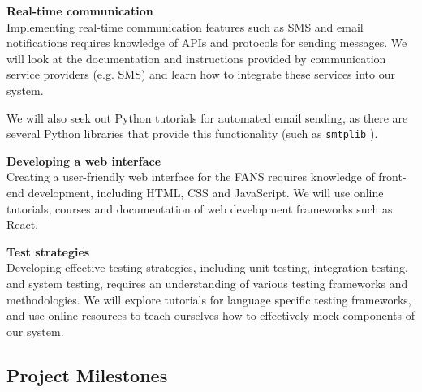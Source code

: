 \textbf{Real-time communication} \\
Implementing real-time communication features such as SMS and email notifications requires
knowledge of APIs and protocols for sending messages. We will look at the documentation and instructions provided by
communication service providers (e.g. SMS) and learn how to integrate these services into our system.

We will also seek out Python tutorials for automated email sending, as there are several Python libraries that provide
this functionality (such as \texttt{smtplib} \cite{python-email}).

\textbf{Developing a web interface} \\
Creating a user-friendly web interface for the FANS requires knowledge of front-end development, including HTML, CSS
and JavaScript. We will use online tutorials, courses and documentation of web development frameworks such as React.

\textbf{Test strategies} \\
Developing effective testing strategies, including unit testing, integration testing, and system
testing, requires an understanding of various testing frameworks and methodologies. We will explore tutorials for
language specific testing frameworks, and use online resources to teach ourselves how to effectively mock components of
our system.

\subsection{Project Milestones}

